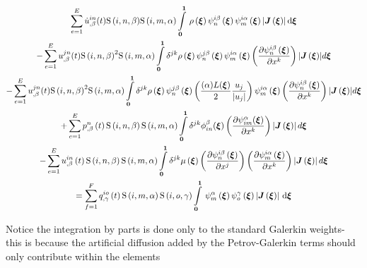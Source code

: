 \begin{multline}
  \dsum_{e=1}^{E}{\idxnodedof{\dot{u}}{i}{n}{\beta}}(t){\idxgsf{i}{n}{\beta}}{\idxgsf{i}{m}{\alpha}}
  \gint{\vectr{0}}{\vectr{1}}{\fnof{\rho}{\vectr{\xi}}{\idxgbfn{i}{n}{\beta}{\vectr{\xi}}\idxgbfn{i}{m}{\alpha}{\vectr{\xi}}
  \abs{\fnof{\matr{J}}{\vectr{\xi}}}}}{\vectr{\xi}}\\
  -\dsum_{e=1}^{E}{\idxnodedof{u}{j}{n}{\beta}}(t){\idxgsf{i}{n}{\beta}}^2{\idxgsf{i}{m}{\alpha}}
   \dintl{\vectr{0}}{\vectr{1}}\delta^{jk}{\fnof{\rho}{\vectr{\xi}}\idxgbfn{j}{n}{\beta}{\vectr{\xi}}
    \idxgbfn{i}{m}{\alpha}{\vectr{\xi}}
     \pbrac{\delby{\idxgbfn{i}{n}{\beta}{\vectr{\xi}}}{x^{k}}}
  \abs{\fnof{\matr{J}}{\vectr{\xi}}}}d{\vectr{\xi}}\\
  -\dsum_{e=1}^{E}{\idxnodedof{u}{j}{n}{\beta}}(t){\idxgsf{i}{n}{\beta}}^2{\idxgsf{i}{m}{\alpha}}
   \dintl{\vectr{0}}{\vectr{1}}\delta^{jk}{\fnof{\rho}{\vectr{\xi}}\idxgbfn{j}{n}{\beta}{\vectr{\xi}}
    \pbrac{\frac{(\alpha){L(\vectr{\xi})}}{2}{\frac{u_j}{\abs{u_j}}}}\idxgbfn{i}{m}{\alpha}{\vectr{\xi}}
     \pbrac{\delby{\idxgbfn{i}{n}{\beta}{\vectr{\xi}}}{x^{k}}}
  \abs{\fnof{\matr{J}}{\vectr{\xi}}}}d{\vectr{\xi}}\\
    +\dsum_{e=1}^{E}{\fnof{\idxnodedof{p}{}{n}{\beta}}{t}\idxgsf{i}{n}{\beta}\idxgsf{i}{m}{\alpha}}
    \dintl{\vectr{0}}{\vectr{1}}\delta^{jk}\phi_{in}^{\beta}({\vectr{\xi}})
    \pbrac{\delby{\psi_{im}^{\alpha}({\vectr{\xi}})}{x^{k}}}\abs{\fnof{\matr{J}}{\vectr{\xi}}}d\vectr{\xi}\\
    -\dsum_{e=1}^{E}\fnof{\idxnodedof{u}{i}{n}{\beta}}{t}\idxgsf{i}{n}{\beta}\idxgsf{i}{m}{\alpha}
    \dintl{\vectr{0}}{\vectr{1}}{\delta^{jk}\fnof{\mu}{\vectr{\xi}}}\pbrac{\delby{\idxgbfn{i}{n}{\beta}{\vectr{\xi}}}{x^{j}}}
      \pbrac{\delby{\idxgbfn{i}{m}{\alpha}{\vectr{\xi}}}{x^{k}}}
      \abs{\fnof{\matr{J}}{\vectr{\xi}}}d{\vectr{\xi}}\\
  =\dsum_{f=1}^{F}\fnof{\idxnodedof{q}{i}{o}{\gamma}}{t}\idxgsf{i}{m}{\alpha}\idxgsf{i}{o}{\gamma}
   \gint{\vectr{0}}{\vectr{1}}{\gbfn{m}{\alpha}{\vectr{\xi}}\gbfn{o}{\gamma}{\vectr{\xi}}
    \abs{\fnof{\matr{J}}{\vectr{\xi}}}}{\vectr{\xi}}\\
  \label{eqn:NSEFEM4}
\end{multline}

Notice the integration by parts is done only to the standard Galerkin weights-
this is because the artificial diffusion added by the Petrov-Galerkin terms
should only contribute within the elements

